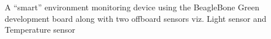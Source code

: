 A “smart” environment monitoring device using the Beagle\+Bone Green development board along with two offboard sensors viz. Light sensor and Temperature sensor 